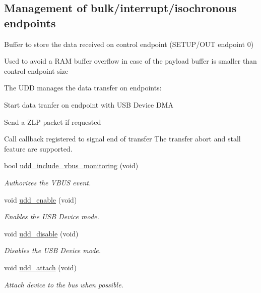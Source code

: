 \subsection*{\-Management of bulk/interrupt/isochronous endpoints}
\label{_amgrpeb26be1d47656a473f2b25d5d9510dc8}%
\-Buffer to store the data received on control endpoint (\-S\-E\-T\-U\-P/\-O\-U\-T endpoint 0)

\-Used to avoid a \-R\-A\-M buffer overflow in case of the payload buffer is smaller than control endpoint size

\-The \-U\-D\-D manages the data transfer on endpoints\-:
\begin{DoxyItemize}
\item \-Start data tranfer on endpoint with \-U\-S\-B \-Device \-D\-M\-A
\item \-Send a \-Z\-L\-P packet if requested
\item \-Call callback registered to signal end of transfer \-The transfer abort and stall feature are supported. 
\end{DoxyItemize}\begin{DoxyCompactItemize}
\item 
bool \hyperlink{group__udd__group_gaa4cac8c35ae056e26cf4ab5b426bbe09}{udd\-\_\-include\-\_\-vbus\-\_\-monitoring} (void)
\begin{DoxyCompactList}\small\item\em \-Authorizes the \-V\-B\-U\-S event. \end{DoxyCompactList}\item 
void \hyperlink{group__udd__group_ga9792d1899ae058e3984d6a622fe2ad42}{udd\-\_\-enable} (void)
\begin{DoxyCompactList}\small\item\em \-Enables the \-U\-S\-B \-Device mode. \end{DoxyCompactList}\item 
void \hyperlink{group__udd__group_gab283432057b934e9d73ac9282d9b0f11}{udd\-\_\-disable} (void)
\begin{DoxyCompactList}\small\item\em \-Disables the \-U\-S\-B \-Device mode. \end{DoxyCompactList}\item 
void \hyperlink{group__udd__group_ga7a7c0d9236c922c2af33c6702565a99f}{udd\-\_\-attach} (void)
\begin{DoxyCompactList}\small\item\em \-Attach device to the bus when possible. \end{DoxyCompactList}\item 

\end{DoxyCompactItemize}

